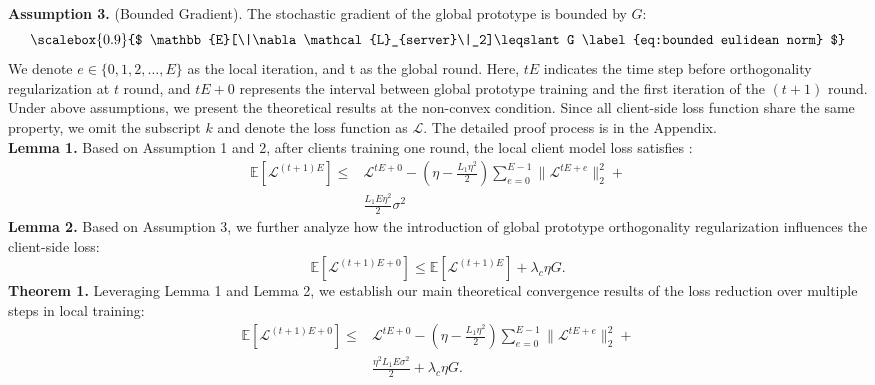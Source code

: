 \textbf{Assumption 3.} (Bounded Gradient). The stochastic gradient of the global prototype is bounded by $G$:
\begin{equation}
\scalebox{0.9}{$
        \mathbb{E}[\|\nabla\mathcal{L}_{server}\|_2]\leqslant G
    \label{eq:bounded eulidean norm}
$}
\end{equation}
We denote $e \in \{0, 1, 2, \ldots, E\}$ as the local iteration, and t as the global round. Here, $tE$ indicates the time step before orthogonality regularization at $t$ round, and $tE + 0$ represents the interval between global prototype training and the first iteration of the $(t+1)$ round. Under above assumptions, we present the theoretical results at the non-convex condition. Since all client-side loss function share the same property, we omit the subscript $k$ and denote the loss function as $\mathcal{L}$. The detailed proof process is in the Appendix.\\
\textbf{Lemma 1.} Based on Assumption 1 and 2, after clients training one round, the local client model loss satisfies \cite{tan2022fedproto}:
\begin{equation}
    \begin{aligned}
        \mathbb{E}\left[\mathcal{L}^{(t+1)E}\right] \leqslant &\mathcal{L}^{tE+0} - \left(\eta - \frac{L_1 \eta^2}{2}\right) \sum_{e=0}^{E-1} \|\mathcal{L}^{tE+e}\|_2^2 + \\
        &\frac{L_1 E \eta^2}{2} \sigma^2
    \end{aligned}
\label{eq:lemma 4.1}
\end{equation}
\textbf{Lemma 2.} Based on Assumption 3, we further analyze how the introduction of global prototype orthogonality regularization influences the client-side loss:
\begin{equation}
\mathbb{E}\left[\mathcal{L}^{(t+1)E+0}\right]\leqslant\mathbb{E}\left[\mathcal{L}^{(t+1)E}\right]+\lambda_c \eta G.
    \label{eq:lemma 4.2}
\end{equation}
\textbf{Theorem 1.} Leveraging Lemma 1 and Lemma 2, we establish our main theoretical convergence results of the loss reduction over multiple steps in local training:
\begin{equation}
    \begin{aligned}
        \mathbb{E}\left[\mathcal{L}^{(t+1)E+0}\right]\leqslant &\mathcal{L}^{tE+0}-\left(\eta-\frac{L_1\eta^2}2\right)\sum_{e=0}^{E-1}\|\mathcal{L}^{tE+e}\|_2^2 +\\
        &\frac{\eta^2 L_1E\sigma^2}2 +\lambda_c \eta G.
    \end{aligned}
    \label{eq:theroem 1}
\end{equation}
